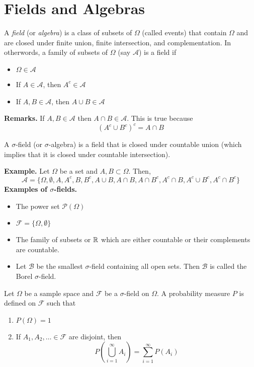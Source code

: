 \section{Fields and Algebras}
\begin{definition}
    A \emph{field} (or \emph{algebra}) is a class of subsets of $\Omega$ (called events) that contain $\Omega$ and are closed under finite union, finite intersection, and complementation. In otherwords, a family of subsets of $\Omega$ (say $\mathcal{A}$) is a field if 
    \begin{itemize}
        \item $\Omega \in \mathcal{A}$
        \item If $A \in \mathcal{A}$, then $A^c \in \mathcal{A}$
        \item If $A,B \in \mathcal{A}$, then $A \cup B \in \mathcal{A}$
    \end{itemize}
\end{definition}
\noindent
\textbf{Remarks.} If $A,B \in \mathcal{A}$ then $A \cap B \in \mathcal{A}$. This is true because 
\[(A^c \cup B^c)^c = A \cap B\]
\begin{definition}
    A $\sigma$-field (or $\sigma$-algebra) is a field that is closed under countable union (which implies that it is closed under countable intersection).
\end{definition}
\noindent
\textbf{Example.} Let $\Omega$ be a set and $A,B \subset \Omega$. Then, 
\[\mathcal{A} = \{\Omega, \emptyset, A, A^c, B, B^c, A\cup B, A \cap B, A \cap B^c, A^c \cap B, A^c \cup B^c, A^c \cap B^c\}\]
\textbf{Examples of $\sigma$-fields.}
\begin{itemize}
    \item The power set $\mathcal{P}(\Omega)$
    \item $\mathcal{F} = \{\Omega, \emptyset\}$
    \item The family of subsets or $\mathbb{R}$ which are either countable or their complements are countable. 
    \item Let $\mathcal{B}$ be the smallest $\sigma$-field containing all open sets. Then $\mathcal{B}$ is called the Borel $\sigma$-field.
\end{itemize}


\begin{definition}
    Let $\Omega$ be a sample space and $\mathcal{F}$ be a $\sigma$-field on $\Omega$. A probability measure $P$ is defined on $\mathcal{F}$ such that 
    \begin{enumerate}[label=(\roman*)]
        \item $P(\Omega) = 1$
        \item If $A_1, A_2, \ldots \in \mathcal{F}$ are disjoint, then 
        \[P\left(\bigcup_{i=1}^\infty A_i\right) = \sum_{i=1}^\infty P(A_i)\]
    \end{enumerate}
\end{definition}

